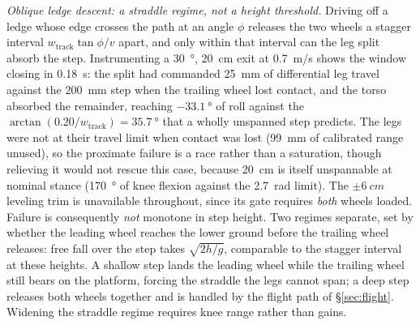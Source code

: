 \documentclass[conference]{IEEEtran}
\begin{document}
\emph{Oblique ledge descent: a straddle regime, not a height threshold.}
Driving off a ledge whose edge crosses the path at an angle $\phi$ releases the
two wheels a stagger interval $w_{\text{track}}\tan\phi/v$ apart, and only within
that interval can the leg split absorb the step. Instrumenting a
\SI{30}{\degree}, \SI{20}{cm} exit at \SI{0.7}{m/s} shows the window closing in
\SI{0.18}{s}: the split had commanded \SI{25}{mm} of differential leg travel
against the \SI{200}{mm} step when the trailing wheel lost contact, and the torso
absorbed the remainder, reaching $\SI{-33.1}{\degree}$ of roll against the
$\arctan(0.20/w_{\text{track}}){=}\SI{35.7}{\degree}$ that a wholly unspanned step
predicts. The legs were not at their travel limit when contact was lost
(\SI{99}{mm} of calibrated range unused), so the proximate failure is a race rather than a saturation, though relieving it would not rescue this case,
because \SI{20}{cm} is itself unspannable at nominal stance (\SI{170}{\degree} of
knee flexion against the \SI{2.7}{rad} limit). The $\pm\SI{6}{cm}$ leveling trim
is unavailable throughout, since its gate requires \emph{both} wheels loaded.
Failure is consequently \emph{not} monotone in step height. Two regimes separate,
set by whether the leading wheel reaches the lower ground before the trailing wheel releases: free fall over the step takes $\sqrt{2h/g}$, comparable to the
stagger interval at these heights. A shallow step lands the leading wheel while
the trailing wheel still bears on the platform, forcing the straddle the legs
cannot span; a deep step releases both wheels together and is handled by the
flight path of \S\ref{sec:flight}. Widening the straddle regime requires knee
range rather than gains.
\end{document}

